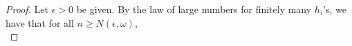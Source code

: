 \begin{proof}
  Let $\epsilon > 0$ be given.  By the law of large numbers for
  finitely many $h_{i}$'s, we have that for all $n \geq N(\epsilon,
  \omega)$,
  \begin{equation}
    \label{eq:29}
  \end{equation}
\end{proof}





